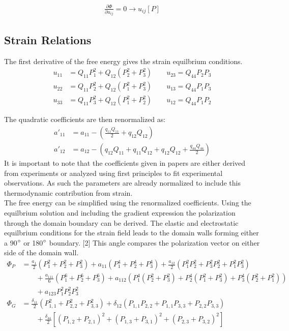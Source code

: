 \documentclass{article}
\begin{document}
\label{sec:Formulation}
\begin{align}
\frac{\partial \Phi}{\partial u_{ij}}=0 \to u_{ij}[P]
\end{align}

\subsection{Strain Relations}
\label{sec:Strain}
The first derivative of the free energy gives the strain equilbrium conditions.
\begin{align}
u_{11} &= Q_{11} P_1^2 + Q_{12}(P_2^2 + P_3^2) \qquad u_{23} = Q_{44}P_2P_3 \\
u_{22} &= Q_{11} P_2^2 + Q_{12}(P_1^2 + P_3^2) \qquad u_{13} =  Q_{44}P_1P_3 \\
u_{33} &= Q_{11} P_3^2 + Q_{12}(P_1^2 + P_2^2) \qquad u_{12} =  Q_{44}P_1P_2
\end{align}

The quadratic coefficients are then renormalized as:
\begin{align}
a'_{11} &=  a_{11}-( \frac{q_{11} Q_{11}}{2}+q_{12}Q_{12}) \\
a'_{12} &= a_{12}-(q_{12} Q_{11}+q_{11} Q_{12}+q_{12} Q_{12}+\frac{q_{44} Q_{44}}{2})
\end{align}
It is important to note that the coefficients given in papers are either derived from experiments or analyzed using first principles to fit experimental observations.  As such the parameters are already normalized to include this thermodynamic contribution from strain. \\
The free energy can be simplified using the renormalized coefficients.  Using the equilbrium solution and including the gradient expression the polarization through the domain boundary can be derived.  The elastic and electrostatic equilbrium conditions for the strain field leads to the domain walls forming either a 90$\degree $ or 180$\degree$ boundary. [2]   This angle compares the polarization vector on either side of the domain wall.
\begin{align*}
\Phi_{P} &= \frac{a_1}{2} \left(P_1^2+P_2^2+P_3^2\right)+a_{11} \left(P_1^4+P_2^4+P_3^4\right)+\frac{a_{12}}{2} \left(P_1^2 P_2^2+P_3^2 P_2^2+P_1^2 P_3^2\right) \\ 
& \qquad + \frac{a_{111}}{6} \left(P_1^6+P_2^6+P_3^6\right)+a_{112} \left( P_1^4\left(P_2^2+P_3^2\right)+P_2^4\left(P_1^2+P_3^2\right)+P_3^4 \left(P_2^2+P_1^2\right)\right) \nonumber \\ \nonumber & \qquad + a_{123} P_1^2 P_2^2 P_3^2 \\
 \Phi_{G} &= \frac{\delta_{11}}{2}(P_{1,1}^2+P_{2,2}^2+P_{3,3}^2)+\delta_{12}(P_{1,1} P_{2,2}+P_{1,1} P_{3,3}+ P_{2,2} P_{3,3}) \\
 & \qquad +\frac{\delta_{44}}{2}[(P_{1,2}+P_{2,1})^2+(P_{1,3}+P_{3,1})^2+(P_{2,3}+P_{3,2})^2]
\end{align*}
\end{document}
